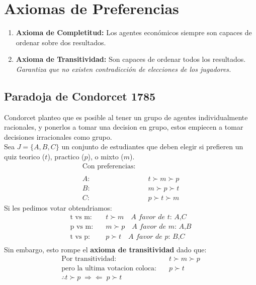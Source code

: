 \documentclass[12pt]{article}
\begin{document}
\section{Axiomas de Preferencias}
\begin{enumerate}
    \item \textbf{Axioma de Completitud:} Los agentes económicos siempre son capaces de ordenar sobre dos resultados. 
    \item \textbf{Axioma de Transitividad:} Son capaces de ordenar todos los resultados. \textit{Garantiza que no existen contradicción de elecciones de los jugadores.} 
\end{enumerate}
\subsection{Paradoja de Condorcet 1785}
Condorcet planteo que es posible al tener un grupo de agentes individualmente racionales, y ponerlos a tomar una decision en grupo, estos empiecen a tomar decisiones irracionales como grupo. \\
Sea $J=\{A,B,C\}$ un conjunto de estudiantes que deben elegir si prefieren un quiz teorico ($t$), practico ($p$), o mixto ($m$). 
\begin{align*}
    \text{Con preferencias:}&\\\\
    A:& \quad t\succ m\succ p \\
    B: & \quad m \succ p \succ t \\
    C: & \quad p \succ t \succ m 
\end{align*}
Si les pedimos votar obtendriamos: 
\begin{align*}
    \text{t vs m:}& \quad t \succ m \quad \textit{A favor de t: A,C}\\
    \text{p vs m:}& \quad m \succ p \quad \textit{A favor de m: A,B}\\
    \text{t vs p:}& \quad p \succ t \quad \textit{A favor de p: B,C}\\
\end{align*}
Sin embargo, esto rompe el \textbf{axioma de transitividad} dado que:
\begin{align*}
   \text{Por transitividad:}& \quad  t \succ m \succ p  \\
   \text{pero la ultima votacion coloca:}&\quad  p \succ t \\
   \therefore t \succ p \;\mathbf{\Rightarrow \Leftarrow} \;p \succ t
\end{align*}
\end{document}
